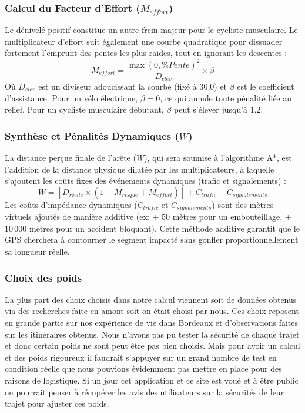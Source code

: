 \subsubsection{Calcul du Facteur d'Effort ($M_{effort}$)}
Le dénivelé positif constitue un autre frein majeur pour le cycliste musculaire. Le multiplicateur d'effort suit également une courbe quadratique pour dissuader fortement l'emprunt des pentes les plus raides, tout en ignorant les descentes :
\begin{equation}
    M_{effort} = \frac{\max(0, \%Pente)^2}{D_{elev}} \times \beta
\end{equation}
Où $D_{elev}$ est un diviseur adoucissant la courbe (fixé à 30,0) et $\beta$ est le coefficient d'assistance. Pour un vélo électrique, $\beta = 0$, ce qui annule toute pénalité liée au relief. Pour un cycliste musculaire débutant, $\beta$ peut s'élever jusqu'à 1,2.

\subsubsection{Synthèse et Pénalités Dynamiques ($W$)}
La distance perçue finale de l'arête ($W$), qui sera soumise à l'algorithme A*, est l'addition de la distance physique dilatée par les multiplicateurs, à laquelle s'ajoutent les coûts fixes des événements dynamiques (trafic et signalements) :
\begin{equation}
    W = \left[ D_{réelle} \times (1 + M_{risque} + M_{effort}) \right] + C_{trafic} + C_{signalements}
\end{equation}
Les coûts d'impédance dynamiques ($C_{trafic}$ et $C_{signalements}$) sont des mètres virtuels ajoutés de manière additive (ex: + 50 mètres pour un embouteillage, + 10\,000 mètres pour un accident bloquant). 
Cette méthode additive garantit que le GPS cherchera à contourner le segment impacté sans gonfler proportionnellement sa longueur réelle.

\subsubsection{Choix des poids}
La plus part des choix choisis dans notre calcul viennent soit de données obtenus via des recherches faite en amont soit on était choisi par nous.
Ces choix reposent en grande partie sur nos expérience de vie dans Bordeaux et d'observations faites sur les itinéraires obtenus.
Nous n'avons pas pu tester la sécurité de chaque trajet et donc certain poids ne sont peut être pas bien choisis.
Mais pour avoir un calcul et des poids rigoureux il faudrait s'appuyer sur un grand nombre de test en condition réelle que nous pouvions évidemment pas mettre en place pour des raisons de logistique.
Si un jour cet application et ce site est voué et à être public on pourrait penser à récupérer les avis des utilisateurs sur la sécurités de leur trajet pour ajuster ces poids.

